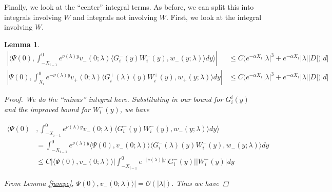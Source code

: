 \documentclass[12pt]{article}
\newtheorem{lemma}{Lemma}
\begin{document}
Finally, we look at the ``center'' integral terms. As before, we can split this into integrals involving $W$ and integrals not involving $W$. First, we look at the integral involving $W$.


\begin{lemma} 

\begin{align*}
\left| \langle \Psi(0), \int_{-X_{i-1}}^0
e^{\nu(\lambda)y} v_-(0; \lambda) \langle G_i^-(y)W_i^-(y), w_-(y; \lambda) \rangle dy \rangle \right| &\leq C \Big( e^{-\tilde{\alpha} X_1} |\lambda|^3 + e^{-\tilde{\alpha} X_1} |\lambda| |D| \Big) |d| \\
\left| \Psi(0), \int_{X_i}^0 e^{-\nu(\lambda)y} v_+(0; \lambda) \langle G_i^+(\lambda)(y)W_i^+(y), w_+(y; \lambda) \rangle dy  \right| &\leq C \Big( e^{-\tilde{\alpha} X_1} |\lambda|^3 + e^{-\tilde{\alpha} X_1} |\lambda| |D| \Big) |d|
\end{align*}

\begin{proof}

We do the ``minus'' integral here. Substituting in our bound for $G_i^i(y)$ and the improved bound for $W_i^-(y)$, we have

\begin{align*}
\langle \Psi(0) &, \int_{-X_{i-1}}^0
e^{\nu(\lambda)y} v_-(0; \lambda) \langle G_i^-(y)W_i^-(y), w_-(y; \lambda) \rangle dy \rangle \\
&= \int_{-X_{i-1}}^0
e^{\nu(\lambda)y} \langle \Psi(0), v_-(0; \lambda) \rangle \langle G_i^-(\lambda)(y)W_i^-(y), w_-(y; \lambda) \rangle dy \\
&\leq C |\langle \Psi(0), v_-(0; \lambda) \rangle| 
\int_{-X_{i-1}}^0 e^{-|\nu(\lambda)|y} |G_i^-(y)||W_i^-(y)| dy 
\end{align*}

From Lemma \ref{jumpc}, $\Psi(0), v_-(0; \lambda) \rangle| = \mathcal{O}(|\lambda|)$. Thus we have


\end{proof}
\end{lemma}
\end{document}
